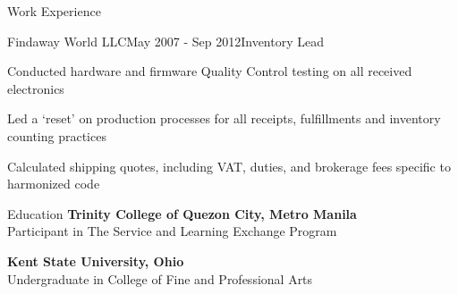\documentclass{resume}
\begin{document}
\begin{rSection}{Work Experience}
\begin{rSubsection}
{Findaway World LLC}{May 2007 - Sep 2012}{Inventory Lead}{}
 \item Conducted hardware and firmware Quality Control testing on all received electronics
 \item Led a ‘reset’ on production processes for all receipts, fulfillments and inventory counting practices
 \item Calculated shipping quotes, including VAT, duties, and brokerage fees specific to harmonized code
\end{rSubsection}
\end{rSection}

\begin{rSection}{Education}
{\bf Trinity College of Quezon City, Metro Manila}
\\Participant in The Service and Learning Exchange Program

{\bf Kent State University, Ohio}
\\ Undergraduate in College of Fine and Professional Arts
\end{rSection}
\end{document}
